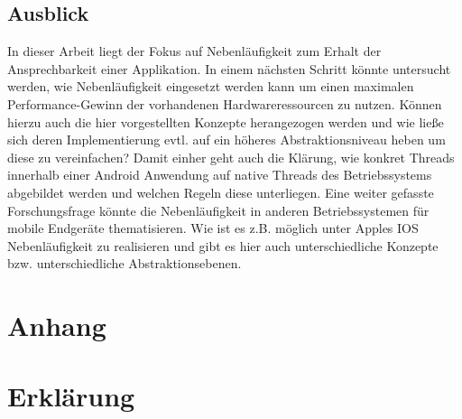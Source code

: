 \documentclass[12pt,oneside,a4paper,bibtotoc,liststotoc]{scrreprt}
\begin{document}
\section{Ausblick}
In dieser Arbeit liegt der Fokus auf Nebenläufigkeit zum Erhalt der Ansprechbarkeit einer Applikation. In einem nächsten Schritt könnte untersucht werden, wie Nebenläufigkeit eingesetzt werden kann um einen maximalen Performance-Gewinn der vorhandenen Hardwareressourcen zu nutzen. Können hierzu auch die hier vorgestellten Konzepte herangezogen werden und wie ließe sich deren Implementierung evtl. auf ein höheres Abstraktionsniveau heben um diese zu vereinfachen? Damit einher geht auch die Klärung, wie konkret Threads innerhalb einer Android Anwendung auf native Threads des Betriebssystems abgebildet werden und welchen Regeln diese unterliegen. Eine weiter gefasste Forschungsfrage könnte die Nebenläufigkeit in anderen Betriebssystemen für mobile Endgeräte thematisieren. Wie ist es z.B. möglich unter Apples IOS Nebenläufigkeit zu realisieren und gibt es hier auch unterschiedliche Konzepte bzw. unterschiedliche Abstraktionsebenen.

\nocite{javaConInPrac, nebenlaeufigeProg, handlerLooperBlock, android5, philosofen, handlerLooperBlock, androidDevDocu, declarativProgrammingScript, declarativCriticalJurnal, funcProgrJava, rxAllgDoku, heiseReactiveManifesto, reactiveManifesto, androidConcurrencyCriticalCompare, rxJavaCaseStudi, rxJavaTutorial, rxInitiative, futureToObservable, rxOnAndroidTips}
%


%


\appendix

\chapter*{Anhang}
\chapter{Erklärung}
\end{document}
